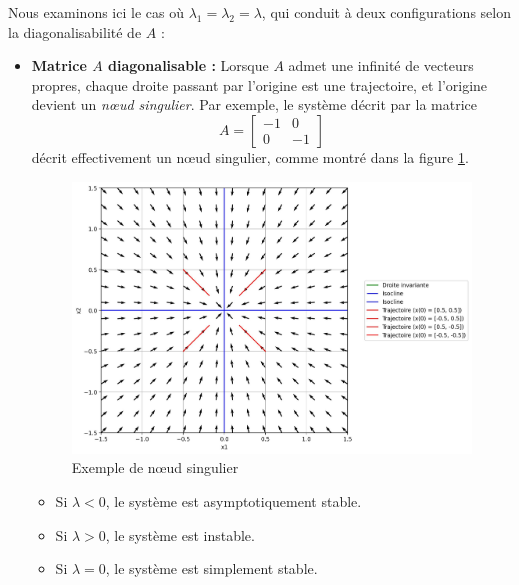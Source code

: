             Nous examinons ici le cas où $\lambda_1 = \lambda_2 = \lambda$, qui conduit à deux configurations selon la diagonalisabilité de $A$ :

            \begin{itemize}
                \item \textbf{Matrice $A$ diagonalisable :} Lorsque $A$ admet une infinité de vecteurs propres, chaque droite passant par l'origine est une trajectoire, et l'origine devient un \textit{nœud singulier}. Par exemple, le système décrit par la matrice
                \begin{equation}
                    A = \begin{bmatrix} -1 & 0 \\ 0 & -1 \end{bmatrix}
                \end{equation}
                décrit effectivement un nœud singulier, comme montré dans la figure \ref{fig:noeud_singulier}.
                \begin{figure}[ht!]
                    \centering
                    \includegraphics[width=\textwidth]{images/noeud_singulier.jpg}
                    \caption{Exemple de nœud singulier}
                    \label{fig:noeud_singulier}
                \end{figure}
                \begin{itemize}
                    \item Si $\lambda < 0$, le système est asymptotiquement stable.
                    \item Si $\lambda > 0$, le système est instable.
                    \item Si $\lambda = 0$, le système est simplement stable.
                \end{itemize}
            

\end{itemize}
